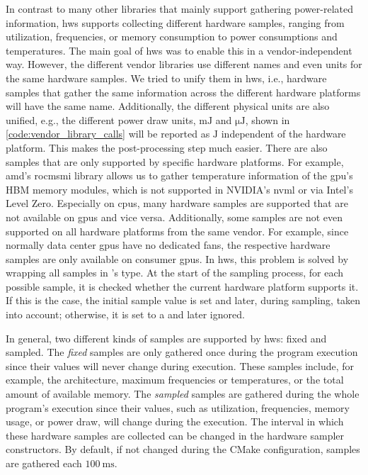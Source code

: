 In contrast to many other libraries that mainly support gathering power-related information, hws supports collecting different hardware samples, ranging from utilization, frequencies, or memory consumption to power consumptions and temperatures. 
The main goal of hws was to enable this in a vendor-independent way. 
However, the different vendor libraries use different names and even units for the same hardware samples. 
We tried to unify them in hws, i.e., hardware samples that gather the same information across the different hardware platforms will have the same name. 
Additionally, the different physical units are also unified, e.g., the different power draw units, $\si{\milli\joule}$ and $\si{\micro\joule}$, shown in \autoref{code:vendor_library_calls} will be reported as $\si{\joule}$ independent of the hardware platform. 
This makes the post-processing step much easier. 
There are also samples that are only supported by specific hardware platforms. 
For example, \gls{amd}'s \gls{rocmsmi} library allows us to gather temperature information of the \gls{gpu}'s HBM memory modules, which is not supported in NVIDIA's \gls{nvml} or via Intel's Level Zero. 
Especially on \glspl{cpu}, many hardware samples are supported that are not available on \glspl{gpu} and vice versa. 
Additionally, some samples are not even supported on all hardware platforms from the same vendor. 
For example, since normally data center \glspl{gpu} have no dedicated fans, the respective hardware samples are only available on consumer \glspl{gpu}. 
In hws, this problem is solved by wrapping all samples in \cpp's  type. 
At the start of the sampling process, for each possible sample, it is checked whether the current hardware platform supports it. 
If this is the case, the initial sample value is set and later, during sampling, taken into account; otherwise, it is set to a  and later ignored. 


In general, two different kinds of samples are supported by hws: fixed and sampled. 
The \textit{fixed} samples are only gathered once during the program execution since their values will never change during execution. 
These samples include, for example, the architecture, maximum frequencies or temperatures, or the total amount of available memory. 
The \textit{sampled} samples are gathered during the whole program's execution since their values, such as utilization, frequencies, memory usage, or power draw, will change during the execution.  
The interval in which these hardware samples are collected can be changed in the hardware sampler constructors. 
By default, if not changed during the CMake configuration, samples are gathered each $\SI{100}{\milli\second}$. 

